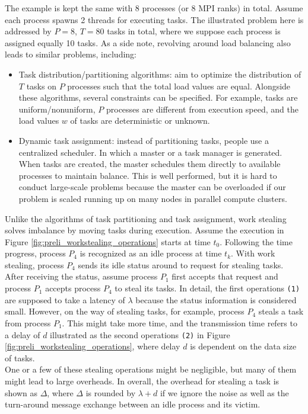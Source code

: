 The example is kept the same with 8 processes (or 8 MPI ranks) in total. Assume each process spawns 2 threads for executing tasks. The illustrated problem here is addressed by $P=8$, $T=80$ tasks in total, where we suppose each process is assigned equally 10 tasks. As a side note, revolving around load balancing also leads to similar problems, including:
\begin{itemize}
	\item Task distribution/partitioning algorithms: aim to optimize the distribution of $T$ tasks on $P$ processes such that the total load values are equal. Alongside these algorithms, several constraints can be specified. For example, tasks are uniform/nonuniform, $P$ processes are different from execution speed, and the load values $w$ of tasks are deterministic or unknown.
	\item Dynamic task assignment: instead of partitioning tasks, people use a centralized scheduler. In which a master or a task manager is generated. When tasks are created, the master schedules them directly to available processes to maintain balance. This is well performed, but it is hard to conduct large-scale problems because the master can be overloaded if our problem is scaled running up on many nodes in parallel compute clusters.
\end{itemize}

Unlike the algorithms of task partitioning and task assignment, work stealing solves imbalance by moving tasks during execution. Assume the execution in Figure \ref{fig:preli_workstealing_operations} starts at time $t_{0}$. Following the time progress, process $P_{4}$ is recognized as an idle process at time $t_{k}$. With work stealing, process $P_{4}$ sends its idle status around to request for stealing tasks. After receiving the status, assume process $P_{1}$ first accepts that request and process $P_{1}$ accepts process $P_{4}$ to steal its tasks. In detail, the first operations \texttt{(1)} are supposed to take a latency of $\lambda$ because the status information is considered small. However, on the way of stealing tasks, for example, process $P_{4}$ steals a task from process $P_{1}$. This might take more time, and the transmission time refers to a delay of $d$ illustrated as the second operations \texttt{(2)} in Figure \ref{fig:preli_workstealing_operations}, where delay $d$ is dependent on the data size of tasks.\\

One or a few of these stealing operations might be negligible, but many of them might lead to large overheads. In overall, the overhead for stealing a task is shown as $\Delta$, where $\Delta$ is rounded by $\lambda + d$ if we ignore the noise as well as the turn-around message exchange between an idle process and its victim.\\

